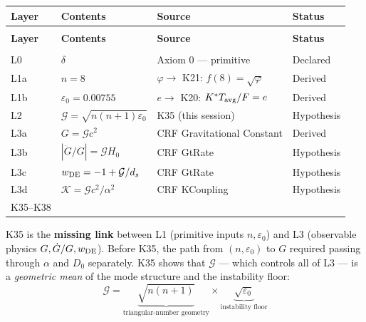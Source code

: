 \documentclass[12pt, a4paper]{article}
\begin{document}
{\small
\setlength{\LTpre}{4pt}
\setlength{\LTpost}{4pt}
\renewcommand{\arraystretch}{1.30}
\begin{longtable}{>{\raggedright\arraybackslash}p{1.2cm}
                  >{\raggedright\arraybackslash}p{3.8cm}
                  >{\raggedright\arraybackslash}p{4.5cm}
                  >{\raggedright\arraybackslash}p{2.2cm}}
\toprule
\textbf{Layer} & \textbf{Contents} & \textbf{Source} & \textbf{Status} \\
\midrule
\endfirsthead
\multicolumn{4}{l}{\small\textit{(continued)}} \\[4pt]
\toprule
\textbf{Layer} & \textbf{Contents} & \textbf{Source} & \textbf{Status} \\
\midrule
\endhead
\midrule
\multicolumn{4}{r}{\small\textit{(continues)}} \\
\endfoot
\bottomrule
\endlastfoot
L0  & $\delta$ & Axiom 0 --- primitive & Declared \\
L1a & $n=8$ & $\varphi\to$ K21: $f(8)=\sqrt{\varphi}$ & Derived \\
L1b & $\varepsilon_0=0.00755$ & $e\to$ K20: $K^*T_{\rm avg}/F=e$ & Derived \\
L2  & $\mathcal{G}=\sqrt{n(n+1)\varepsilon_0}$ & K35 (this session) & Hypothesis \\
L3a & $G=\mathcal{G}c^2$ & CRF Gravitational Constant & Derived \\
L3b & $|\dot{G}/G|=\mathcal{G}H_0$ & CRF GtRate & Hypothesis \\
L3c & $w_{\rm DE}=-1+\mathcal{G}/d_s$ & CRF GtRate & Hypothesis \\
L3d & $\mathcal{K}=\mathcal{G}c^2/\alpha^2$ & CRF KCoupling & Hypothesis \\
\midrule
K35--K38 & \multicolumn{3}{p{10.5cm}}{Internal consistency relations within L1--L2} \\
\end{longtable}
}

K35 is the \textbf{missing link} between L1 (primitive inputs $n,\varepsilon_0$) and L3
(observable physics $G,\dot{G}/G,w_{\rm DE}$). Before K35, the path from $(n,\varepsilon_0)$
to $G$ required passing through $\alpha$ and $D_0$ separately. K35 shows that $\mathcal{G}$
--- which controls all of L3 --- is a \emph{geometric mean} of the mode structure and
the instability floor:
\[
  \mathcal{G} = \underbrace{\sqrt{n(n+1)}}_{\text{triangular-number geometry}}
  \times \underbrace{\sqrt{\varepsilon_0}}_{\text{instability floor}}
\]

\end{document}
